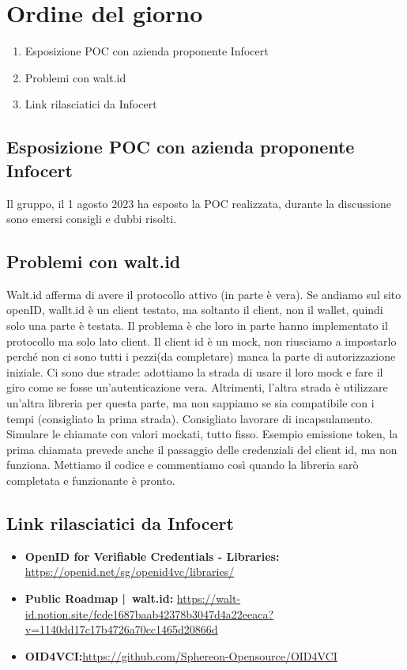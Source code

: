 \section{Ordine del giorno}
\begin{enumerate}
\item Esposizione POC con azienda proponente Infocert
\item Problemi con walt.id
\item Link rilasciatici da Infocert
\end{enumerate}

\subsection{Esposizione POC con azienda proponente Infocert} 
Il gruppo, il 1 agosto 2023 ha esposto la POC realizzata, durante la discussione sono emersi consigli e dubbi risolti.




\subsection{Problemi con walt.id}
Walt.id afferma di avere il protocollo attivo (in parte è vera).
Se andiamo sul sito openID, wallt.id è un client testato, ma soltanto il client, non il wallet, quindi solo una parte è testata.
Il problema è che loro in parte hanno implementato il protocollo ma solo lato client.
Il client id è un mock, non riusciamo a impostarlo perché non ci sono tutti i pezzi(da completare) manca la parte di autorizzazione iniziale.
Ci sono due strade: adottiamo la strada di usare il loro mock e fare il giro come se fosse un'autenticazione vera.
Altrimenti, l'altra strada è utilizzare un'altra libreria per questa parte, ma non sappiamo se sia compatibile con i tempi (consigliato la prima strada).
Consigliato lavorare di incapsulamento.
Simulare le chiamate con valori mockati, tutto fisso. Esempio emissione token, la prima chiamata prevede anche il passaggio delle credenziali del client id, ma non funziona.
Mettiamo il codice e commentiamo così quando la libreria sarò completata e funzionante è pronto.

\subsection{Link rilasciatici da Infocert}
\begin{itemize}
\item \textbf{OpenID for Verifiable Credentials - Libraries:} \url{https://openid.net/sg/openid4vc/libraries/}
\item \textbf{Public Roadmap | walt.id:} \url{https://walt-id.notion.site/fcde1687baab42378b3047d4a22eeaca?v=1140dd17c17b4726a70cc1465d20866d}
\item \textbf{OID4VCI:}\url{https://github.com/Sphereon-Opensource/OID4VCI}
\end{itemize}
